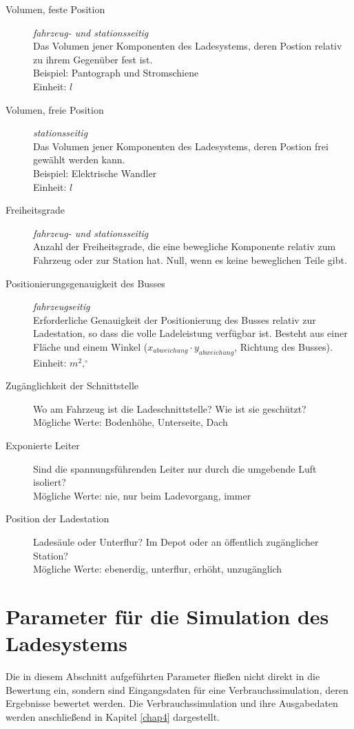 \begin{description}
	\item [Volumen, feste Position] \emph{fahrzeug- und stationsseitig}\\
	Das Volumen jener Komponenten des Ladesystems, deren Postion relativ zu ihrem Gegenüber fest ist.\\
	Beispiel: Pantograph und Stromschiene\\
	Einheit: $l$
	\item [Volumen, freie Position] \emph{stationsseitig}\\
	Das Volumen jener Komponenten des Ladesystems, deren Postion frei gewählt werden kann.\\
	Beispiel: Elektrische Wandler\\
	Einheit: $l$
	\item [Freiheitsgrade] \emph{fahrzeug- und stationsseitig}\\
	Anzahl der Freiheitsgrade, die eine bewegliche Komponente relativ zum Fahrzeug oder zur Station hat. Null, wenn es keine beweglichen Teile gibt.
	\item [Positionierungsgenauigkeit des Busses] \emph{fahrzeugseitig} \\
	Erforderliche Genauigkeit der Positionierung des Busses relativ zur Ladestation, so dass die volle Ladeleistung verfügbar ist. Besteht aus einer Fläche und einem Winkel ($x_{abweichung}\cdot y_{abweichung}$, Richtung des Busses).\\
	Einheit: $m^2,^\circ$
	\item [Zugänglichkeit der Schnittstelle]
	Wo am Fahrzeug ist die Ladeschnittstelle? Wie ist sie geschützt?\\
	Mögliche Werte: Bodenhöhe, Unterseite, Dach
	\item [Exponierte Leiter]
	Sind die spannungsführenden Leiter nur durch die umgebende Luft isoliert?\\
	Mögliche Werte: nie, nur beim Ladevorgang, immer
	\item [Position der Ladestation]
	Ladesäule oder Unterflur? Im Depot oder an öffentlich zugänglicher Station?\\
	Mögliche Werte: ebenerdig, unterflur, erhöht, unzugänglich	
\end{description}

\section{Parameter für die Simulation des Ladesystems}
\label{parameterIndirekt}
Die in diesem Abschnitt aufgeführten Parameter fließen nicht direkt in die Bewertung ein, sondern sind Eingangsdaten für eine Verbrauchssimulation, deren Ergebnisse bewertet werden. Die Verbrauchssimulation und ihre Ausgabedaten werden anschließend in Kapitel \ref{chap4} dargestellt.

